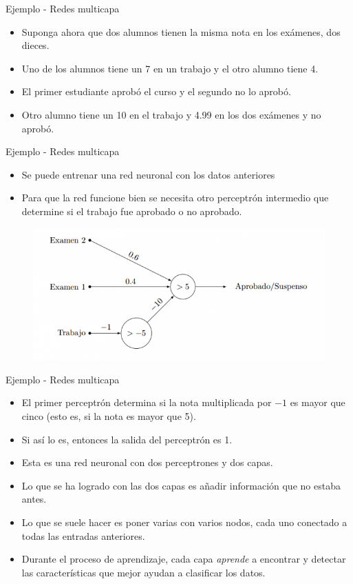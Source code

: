 \documentclass[11pt,aspectratio=169]{beamer}
\begin{document}
\begin{frame}{Ejemplo - Redes multicapa}
	\begin{itemize}
		\item Suponga ahora que dos alumnos tienen la misma nota en los exámenes, dos dieces.\pause
		\item Uno de los alumnos tiene un 7 en un trabajo y el otro alumno tiene 4.\pause
		\item El primer estudiante aprobó el curso y el segundo no lo aprobó.\pause
		\item Otro alumno tiene un 10 en el trabajo y 4.99 en los dos exámenes y no aprobó.
	\end{itemize}
\end{frame}

\begin{frame}{Ejemplo - Redes multicapa}
	\begin{itemize}
		\item Se puede entrenar una red neuronal con los datos anteriores\pause
		\item Para que la red funcione bien se necesita otro perceptrón intermedio que determine si el 
		trabajo fue aprobado o no aprobado.\pause
	\end{itemize}
	\begin{figure}
		\centering
		\includegraphics[scale=0.6]{img/rn03.png}
	\end{figure}
\end{frame}

\begin{frame}{Ejemplo - Redes multicapa}
	\begin{itemize}
		\item El primer perceptrón determina si la nota multiplicada por $-1$ es mayor que cinco (esto es, si
			la nota es mayor que 5).\pause
		\item Si así lo es, entonces la salida del perceptrón es 1.\pause
		\item Esta es una red neuronal con dos perceptrones y dos capas.\pause
		\item Lo que se ha logrado con las dos capas es añadir información que no estaba antes.\pause
		\item Lo que se suele hacer es poner varias con varios nodos, cada uno conectado a todas las entradas anteriores.\pause
		\item Durante el proceso de aprendizaje, cada capa \textit{aprende} a encontrar y detectar las características 
			que mejor ayudan a clasificar los datos.
	\end{itemize}
\end{frame}
\end{document}
